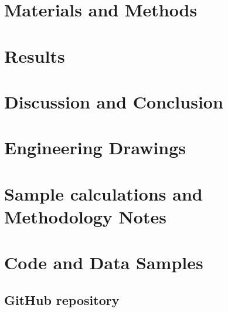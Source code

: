 \documentclass[12pt]{report}  %
\begin{document}
%
\chapter {Materials and Methods}
\label{ch:matsNmets}


%
\chapter{Results}
\label{ch:results}


%
\chapter{Discussion and Conclusion}
\label{ch:disCon}



\appendix %
\chapter{Engineering Drawings} \label{sec:appDrawings}%


\chapter{Sample calculations and Methodology Notes}\label{sec:sampleCalcs}



%

\chapter{Code and Data Samples}\label{sec:appCodeNData}


\section{GitHub repository}\label{app:github}

\end{document}
